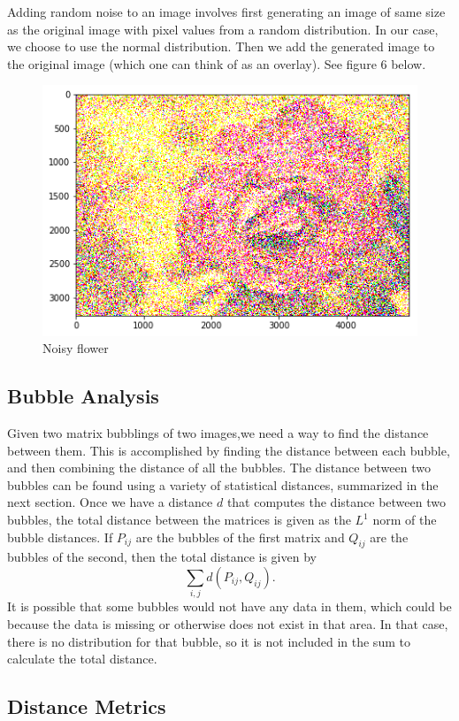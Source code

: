 \documentclass{article}
\begin{document}
Adding random noise to an image involves first generating an image of same size
as the original image with pixel values from a random distribution. In our
case, we choose to use the normal distribution. Then we add the generated image
to the original image (which one can think of as an overlay). See figure 6
below.

\begin{figure}[h!]
\centering
\includegraphics[scale=0.6]{noisy_flower.png}
\caption{Noisy flower}
\end{figure}

\subsection{Bubble Analysis}

Given two matrix bubblings of two images,we need a way to find the distance
between them. This is accomplished by finding the distance between each bubble,
and then combining the distance of all the bubbles. The distance between two
bubbles can be found using a variety of statistical distances, summarized in
the next section. Once we have a distance $d$ that computes the distance
between two bubbles, the total distance between the matrices is given as the
$L^1$ norm of the bubble distances. If $P_{ij}$ are the bubbles of the first
matrix and $Q_{ij}$ are the bubbles of the second, then the total distance is
given by
\[
    \sum_{i,j} d(P_{ij},Q_{ij}).
\]
It is possible that some bubbles would not have any data in them, which could
be because the data is missing or otherwise does not exist in that area. In
that case, there is no distribution for that bubble, so it is not included in
the sum to calculate the total distance.

\subsection{Distance Metrics}
\end{document}
